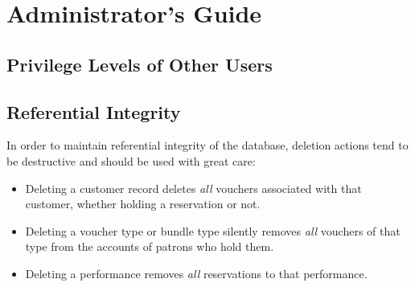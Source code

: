 \section{Administrator's Guide}
\label{chap:admin}

\subsection{Privilege Levels of Other Users}



\subsection{Referential Integrity}
\label{sec:integrity}

In order to maintain referential integrity of the database, deletion
actions tend to be destructive and should be used with great care:

\begin{itemize}
\item Deleting a customer record deletes \emph{all} vouchers associated
  with that customer, whether holding a reservation or not.
\item Deleting a voucher type or bundle type silently removes
  \emph{all} vouchers of that type from the accounts of patrons who hold
  them. 
\item Deleting a performance removes \emph{all} reservations to that
  performance.
\end{itemize}
